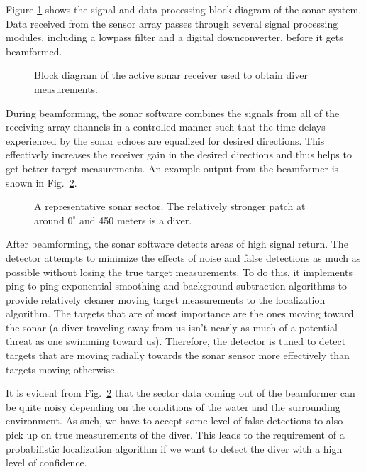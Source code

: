 \documentclass{article} %
\begin{document}
Figure \ref{fig:blocks} shows the signal and data processing block diagram of the sonar system. Data received from the sensor array passes through several signal processing modules, including a lowpass filter and a digital downconverter, before it gets beamformed.

\begin{figure}[htbp]
  \centering
  \caption{Block diagram of the active sonar receiver used to obtain diver measurements.}
  \label{fig:blocks}
\end{figure}

During beamforming, the sonar software combines the signals from all of the receiving array channels in a controlled manner such that the time delays experienced by the sonar echoes are equalized for desired directions. This effectively increases the receiver gain in the desired directions and thus helps to get better target measurements. An example output from the beamformer is shown in Fig.~\ref{fig:sector_example}.

\begin{figure}[htbp]
  \centering
  \caption{A representative sonar sector. The relatively stronger patch at around $0^{\circ}$ and 450 meters is a diver.}
  \label{fig:sector_example}
\end{figure}

After beamforming, the sonar software detects areas of high signal return. The detector attempts to minimize the effects of noise and false detections as much as possible without losing the true target measurements. To do this, it implements ping-to-ping exponential smoothing and background subtraction algorithms to provide relatively cleaner moving target measurements to the localization algorithm. The targets that are of most importance are the ones moving toward the sonar (a diver traveling away from us isn't nearly as much of a potential threat as one swimming toward us). Therefore, the detector is tuned to detect targets that are moving radially towards the sonar sensor more effectively than targets moving otherwise.

It is evident from Fig.~\ref{fig:sector_example} that the sector data coming out of the beamformer can be quite noisy depending on the conditions of the water and the surrounding environment. As such, we have to accept some level of false detections to also pick up on true measurements of the diver. This leads to the requirement of a probabilistic localization algorithm if we want to detect the diver with a high level of confidence.
\end{document}
